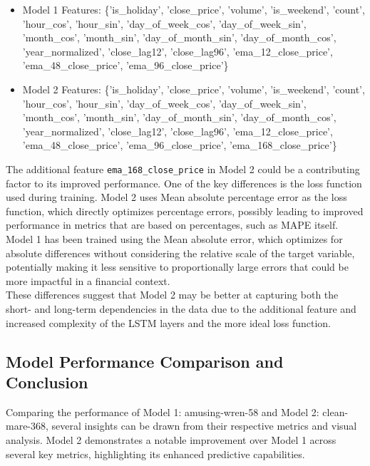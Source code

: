 \begin{itemize}
    \item Model 1 Features: \{'is\_holiday', 'close\_price', 'volume', 'is\_weekend', 'count', 'hour\_cos', 'hour\_sin', 'day\_of\_week\_cos', 'day\_of\_week\_sin', 'month\_cos', 'month\_sin', 'day\_of\_month\_sin', 'day\_of\_month\_cos', 'year\_normalized', 'close\_lag12', 'close\_lag96', 'ema\_12\_close\_price', 'ema\_48\_close\_price', 'ema\_96\_close\_price'\}
    \item Model 2 Features: \{'is\_holiday', 'close\_price', 'volume', 'is\_weekend', 'count', 'hour\_cos', 'hour\_sin', 'day\_of\_week\_cos', 'day\_of\_week\_sin', 'month\_cos', 'month\_sin', 'day\_of\_month\_sin', 'day\_of\_month\_cos', 'year\_normalized', 'close\_lag12', 'close\_lag96', 'ema\_12\_close\_price', 'ema\_48\_close\_price', 'ema\_96\_close\_price', 'ema\_168\_close\_price'\}
\end{itemize}

The additional feature \texttt{ema\_168\_close\_price} in Model 2 could be a contributing factor to its improved performance. One of the key differences is the loss function used during training. Model 2 uses Mean absolute percentage error as the loss function, which directly optimizes percentage errors, possibly leading to improved performance in metrics that are based on percentages, such as MAPE itself. Model 1 has been trained using the Mean absolute error, which optimizes for absolute differences without considering the relative scale of the target variable, potentially making it less sensitive to proportionally large errors that could be more impactful in a financial context. \\

These differences suggest that Model 2 may be better at capturing both the short- and long-term dependencies in the data due to the additional feature and increased complexity of the LSTM layers and the more ideal loss function.

\subsection{Model Performance Comparison and Conclusion}
Comparing the performance of Model 1: amusing-wren-58 and Model 2: clean-mare-368, several insights can be drawn from their respective metrics and visual analysis. Model 2 demonstrates a notable improvement over Model 1 across several key metrics, highlighting its enhanced predictive capabilities. \\


